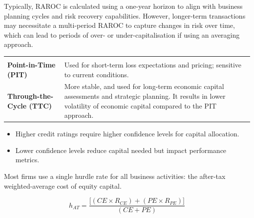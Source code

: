
Typically, RAROC is calculated using a one-year horizon to align with business
planning cycles and risk recovery capabilities. However, longer-term transactions
may necessitate a multi-period RAROC to capture changes in risk over time, which
can lead to periods of over- or under-capitalisation if using an averaging
approach.


\noindent\begin{minipage}{\textwidth}
\renewcommand{\arraystretch}{1.35}
\begin{tabularx}{\textwidth}{@{}L{0.26\textwidth}Y@{}}
  & \\
{\tabfont \textbf{Point-in-Time (PIT)}} &
{\tabfont Used for short-term loss expectations and pricing; sensitive to current
conditions.}\\
{\tabfont \textbf{Through-the-Cycle (TTC)}} &
{\tabfont More stable, and used for long-term economic capital assessments and
strategic planning. It results in lower volatility of economic capital compared to
the PIT approach.}\\
\end{tabularx}
\end{minipage}


\begin{itemize}
\item Higher credit ratings require higher confidence levels for capital
allocation.
\item Lower confidence levels reduce capital needed but impact performance
metrics.
\end{itemize}



Most firms use a single hurdle rate for all business activities: the after-tax
weighted-average cost of equity capital.

\begin{orkeybox}
\[
h_{AT}=\frac{\bigl[(CE \times R_{CE}) + (PE \times R_{PE})\bigr]}{(CE+PE)}
\]
\end{orkeybox}

